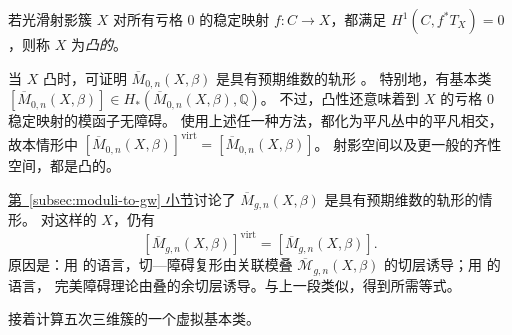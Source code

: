 \begin{definition}\label{def:convex-variety}
 若光滑射影簇 $X$ 对所有亏格 $0$ 的稳定映射 $f:C\to X$，都满足
$H^1(C,f^*T_X)=0$，则称 $X$ 为\emph{凸的}。
\end{definition}
当 $X$ 凸时，可证明 $\overline M_{0,n}(X,\beta)$ 是具有预期维数的轨形 。
特别地，有基本类 $[\overline M_{0,n}(X,\beta)]\in H_*(\overline M_{0,n}(X,\beta),\mathbb Q)$。
不过，凸性还意味着到 $X$ 的亏格 $0$ 稳定映射的模函子无障碍。
使用上述任一种方法，都化为平凡丛中的平凡相交，故本情形中
$[\overline M_{0,n}(X,\beta)]^{\mathrm{virt}}=[\overline M_{0,n}(X,\beta)]$。
射影空间以及更一般的齐性空间，都是凸的。

\hyperref[subsec:moduli-to-gw]{第~\ref*{subsec:moduli-to-gw} 小节}讨论了 $\overline M_{g,n}(X,\beta)$ 是具有预期维数的轨形的情形。
对这样的 $X$，仍有
\[
[\overline M_{g,n}(X,\beta)]^{\mathrm{virt}}=[\overline M_{g,n}(X,\beta)].
\]
原因是：用  的语言，切—障碍复形由关联模叠
$\overline{\mathcal M}_{g,n}(X,\beta)$ 的切层诱导；用  的语言，
完美障碍理论由叠的余切层诱导。与上一段类似，得到所需等式。

接着计算五次三维簇的一个虚拟基本类。

